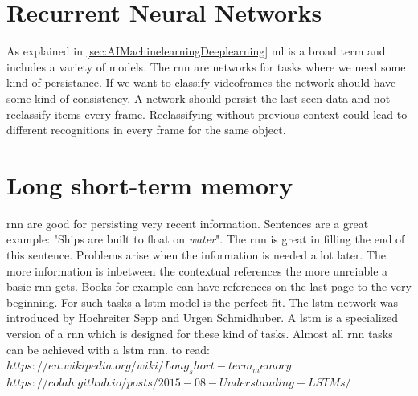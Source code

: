 \documentclass[10pt,a4paper]{article}
\begin{document}
\section{Recurrent Neural Networks}
As explained in \autoref{sec:AIMachinelearningDeeplearning} \gls{ml} is a broad term and includes a variety of models. The \gls{rnn} are networks for tasks where we need some kind of persistance. If we want to classify videoframes the network should have some kind of consistency.\cite{Olah2015} A network should persist the last seen data and not reclassify items every frame. Reclassifying without previous context could lead to different recognitions in every frame for the same object.

\section{Long short-term memory}
\gls{rnn} are good for persisting very recent information. Sentences are a great example: "Ships are built to float on \textit{water}". The \gls{rnn} is great in filling the end of this sentence. Problems arise when the information is needed a lot later. The more information is inbetween the contextual references the more unreiable a basic \gls{rnn} gets. Books for example can have references on the last page to the very beginning. For such tasks a \gls{lstm} model is the perfect fit. The \gls{lstm} network was introduced by Hochreiter Sepp and Urgen Schmidhuber\citep{Hochreiter1997}. A \gls{lstm} is a specialized version of a \gls{rnn} which is designed for these kind of tasks. Almost all \gls{rnn} tasks can be achieved with a \gls{lstm} \gls{rnn}\cite{Olah2015}. 
to read: $https://en.wikipedia.org/wiki/Long_short-term_memory$
$https://colah.github.io/posts/2015-08-Understanding-LSTMs/$
\end{document}
